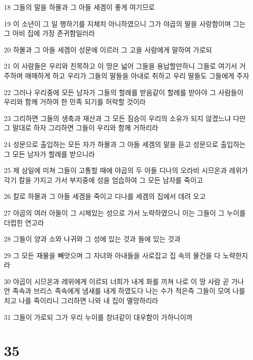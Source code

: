 \par 18 그들의 말을 하몰과 그 아들 세겜이 좋게 여기므로
\par 19 이 소년이 그 일 행하기를 지체치 아니하였으니 그가 야곱의 딸을 사랑함이며 그는 그 아비 집에 가장 존귀함일러라
\par 20 하몰과 그 아들 세겜이 성문에 이르러 그 고을 사람에게 말하여 가로되
\par 21 이 사람들은 우리와 친목하고 이 땅은 넓어 그들을 용납할만하니 그들로 여기서 거주하며 매매하게 하고 우리가 그들의 딸들을 아내로 취하고 우리 딸들도 그들에게 주자
\par 22 그러나 우리중에 모든 남자가 그들의 할례를 받음같이 할례를 받아야 그 사람들이 우리와 함께 거하여 한 민족 되기를 허락할 것이라
\par 23 그리하면 그들의 생축과 재산과 그 모든 짐승이 우리의 소유가 되지 않겠느냐 다만 그 말대로 하자 그리하면 그들이 우리와 함께 거하리라
\par 24 성문으로 출입하는 모든 자가 하몰과 그 아들 세겜의 말을 듣고 성문으로 출입하는 그 모든 남자가 할례를 받으니라
\par 25 제 삼일에 미쳐 그들이 고통할 때에 야곱의 두 아들 디나의 오라비 시므온과 레위가 각기 칼을 가지고 가서 부지중에 성을 엄습하여 그 모든 남자를 죽이고
\par 26 칼로 하몰과 그 아들 세겜을 죽이고 디나를 세겜의 집에서 데려 오고
\par 27 야곱의 여러 아들이 그 시체있는 성으로 가서 노략하였으니 이는 그들이 그 누이를 더럽힌 연고라
\par 28 그들이 양과 소와 나귀와 그 성에 있는 것과 들에 있는 것과
\par 29 그 모든 재물을 빼앗으며 그 자녀와 아내들을 사로잡고 집 속의 물건을 다 노략한지라
\par 30 야곱이 시므온과 레위에게 이르되 너희가 내게 화를 끼쳐 나로 이 땅 사람 곧 가나안 족속과 브리스 족속에게 냄새를 내게 하였도다 나는 수가 적은즉 그들이 모여 나를 치고 나를 죽이리니 그리하면 나와 내 집이 멸망하리라
\par 31 그들이 가로되 그가 우리 누이를 창녀같이 대우함이 가하니이까

\chapter{35}

